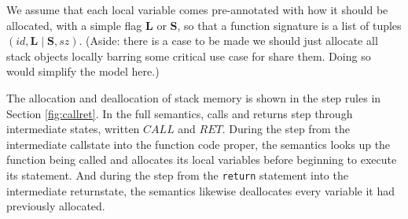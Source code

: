 \documentclass{article}
\begin{document}
We assume that each local variable comes pre-annotated with how it should
be allocated, with a simple flag \(\mathbf{L}\) or \(\mathbf{S}\), so that
a function signature is a list of tuples \((id,\mathbf{L} \mid \mathbf{S},sz)\).
(Aside: there is a case to be made we should just allocate all stack objects locally
barring some critical use case for share them. Doing so would simplify the model
here.)

The allocation and deallocation of stack memory is shown in the step rules in
Section \ref{fig:callret}. In the full semantics, calls and returns step through
intermediate states, written \(\mathit{CALL}\) and \(\mathit{RET}\). During the
step from the intermediate callstate into the function code proper, the semantics
looks up the function being called and allocates its local variables before beginning
to execute its statement. And during the step from the {\tt return} statement into
the intermediate returnstate, the semantics likewise deallocates every variable it had
previously allocated.
\end{document}
